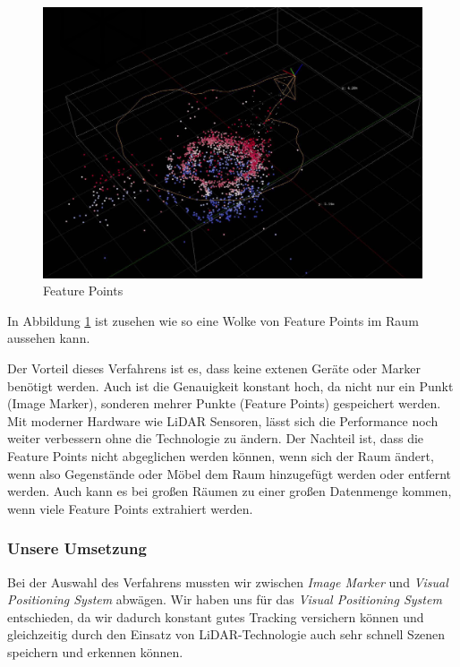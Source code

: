 \documentclass[titlepage, a4paper, 11pt]{scrartcl}
\begin{document}
  \begin{figure}[h]
    \centering
    \includegraphics[width=.5\textwidth]{arworldmap-featurepoints}
    \caption{Feature Points}
    \label{FeaturePoints}
  \end{figure}

  In Abbildung \ref{FeaturePoints} ist zusehen wie so eine Wolke von Feature Points im Raum aussehen kann.

  Der Vorteil dieses Verfahrens ist es, dass keine extenen Geräte oder Marker benötigt werden. Auch ist die Genauigkeit konstant hoch, da nicht nur ein Punkt (Image Marker), sonderen mehrer Punkte (Feature Points) gespeichert werden. Mit moderner Hardware wie LiDAR Sensoren, lässt sich die Performance noch weiter verbessern ohne die Technologie zu ändern.
  Der Nachteil ist, dass die Feature Points nicht abgeglichen werden können, wenn sich der Raum ändert, wenn also Gegenstände oder Möbel dem Raum hinzugefügt werden oder entfernt werden.
  Auch kann es bei großen Räumen zu einer großen Datenmenge kommen, wenn viele Feature Points extrahiert werden.

  \subsubsection{Unsere Umsetzung}

  Bei der Auswahl des Verfahrens mussten wir zwischen \textit{Image Marker} und \textit{Visual Positioning System} abwägen.
  Wir haben uns für das \textit{Visual Positioning System} entschieden, da wir dadurch konstant gutes Tracking versichern können und
  gleichzeitig durch den Einsatz von LiDAR-Technologie auch sehr schnell Szenen speichern und erkennen können.
\end{document}
